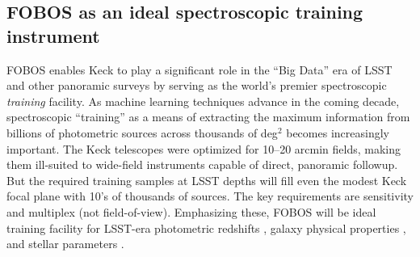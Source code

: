 
\subsection{FOBOS as an ideal spectroscopic training instrument}
\label{sec:datascience}

FOBOS enables Keck to play a significant role in the ``Big Data'' era of LSST and other panoramic surveys by serving as the world's premier spectroscopic \emph{training} facility.  As machine learning techniques advance in the coming decade,  spectroscopic ``training'' as a means of extracting the maximum information from billions of photometric sources across thousands of deg$^2$ becomes increasingly important.  The Keck telescopes were optimized for 10--20 arcmin fields, making them ill-suited to wide-field instruments capable of direct, panoramic followup.  But the required training samples at LSST depths will fill even the modest Keck focal plane with 10's of thousands of sources.  The key requirements are sensitivity and multiplex (not field-of-view).  Emphasizing these, FOBOS will be ideal training facility for LSST-era photometric redshifts \citep[see][]{salvato18}, galaxy physical properties \citep[e.g.,][]{davidzon19}, and stellar parameters \citep[e.g.,][]{2018arXiv180401530T}.






